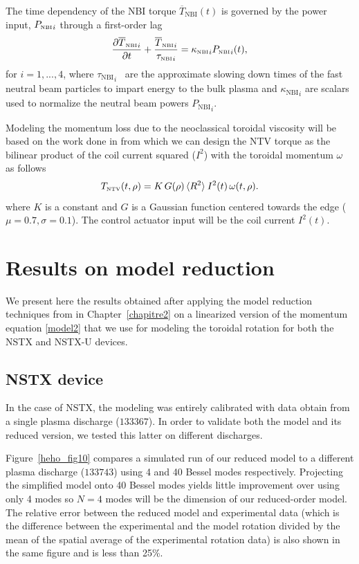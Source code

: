 \documentclass[12pt,lot, lof]{puthesis}
\begin{document}
The time dependency of the NBI torque $\overline{T}_\text{NBI}(t)$ is governed by the power input, $ {P_\textrm{\tiny{NBI}}}_i$ through a first-order lag
 \begin{equation}
\frac{{\partial \overline{T}_\textrm{\tiny{NBI}}}_i}{\partial t}
+ \frac{{\overline{T}_\textrm{\tiny{NBI}}}_i}{{\tau_\textrm{\tiny{NBI}}}_i}  = {\kappa_\textrm{\tiny{NBI}}}_i {P_\textrm{\tiny{NBI}}}_i(t), \label{model7}
\end{equation}
for $i=1,...,4$, where ${\tau_\text{NBI}}_i$ \, are the approximate slowing down times of the fast neutral beam particles to impart energy to the bulk plasma and ${\kappa_\text{NBI}}_i$ are scalars used to normalize the neutral beam powers ${P_\text{NBI}}_i$.

Modeling the momentum loss due to the neoclassical toroidal viscosity will be based on the work done in \cite{Zhu06} from which we can design the NTV torque as the bilinear product of the coil current squared ($I^2$) with the toroidal momentum $\omega$ as follows
\begin{equation}
T_\textrm{\tiny NTV}  (t, \rho) =   K \, G(\rho) \,  \langle R^2 \rangle \:  I^2(t) \,\omega (t, \rho) .
\label{model8}
\end{equation}
where $K$ is a constant and $G$ is a Gaussian function centered towards the edge ($\mu =0.7, \sigma =0.1$). The control actuator input will be the coil current $I^2(t)$.



\section{Results on model reduction}

We present here the results obtained after applying the model reduction techniques from in Chapter~\ref{chapitre2} on a linearized version of the momentum equation \eqref{model2} that we use for modeling the toroidal rotation for both the NSTX and NSTX-U devices.

\subsection{NSTX device}
In the case of NSTX, the modeling was entirely calibrated with data obtain from a single plasma discharge ($133367$). In order to validate both the model and its reduced version, we tested this latter on different discharges.

Figure~\ref{heho_fig10} compares a simulated run of our reduced model to a different plasma discharge ($133743$) using 4 and 40 Bessel modes respectively.
Projecting the simplified model onto 40 Bessel modes yields little improvement over using only 4 modes so $N=4$ modes will be the dimension of our reduced-order model.
The relative error between the reduced model and experimental data (which is the difference between the experimental and the model rotation divided by the mean of the spatial average of the experimental rotation data) is also shown in the same figure and is less than 25\%.
\end{document}
